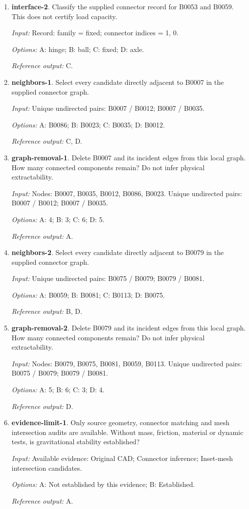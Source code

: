 \begin{enumerate}
\item \textbf{interface-2}. Classify the supplied connector record for B0053 and B0059. This does not certify load capacity.\par {\small \textit{Input:} Record: family = fixed; connector indices = 1, 0. \par\textit{Options:} A: hinge; B: ball; C: fixed; D: axle. \par\textit{Reference output:} C.}
\item \textbf{neighbors-1}. Select every candidate directly adjacent to B0007 in the supplied connector graph.\par {\small \textit{Input:} Unique undirected pairs: B0007 / B0012; B0007 / B0035. \par\textit{Options:} A: B0086; B: B0023; C: B0035; D: B0012. \par\textit{Reference output:} C, D.}
\item \textbf{graph-removal-1}. Delete B0007 and its incident edges from this local graph. How many connected components remain? Do not infer physical extractability.\par {\small \textit{Input:} Nodes: B0007, B0035, B0012, B0086, B0023. Unique undirected pairs: B0007 / B0012; B0007 / B0035. \par\textit{Options:} A: 4; B: 3; C: 6; D: 5. \par\textit{Reference output:} A.}
\item \textbf{neighbors-2}. Select every candidate directly adjacent to B0079 in the supplied connector graph.\par {\small \textit{Input:} Unique undirected pairs: B0075 / B0079; B0079 / B0081. \par\textit{Options:} A: B0059; B: B0081; C: B0113; D: B0075. \par\textit{Reference output:} B, D.}
\item \textbf{graph-removal-2}. Delete B0079 and its incident edges from this local graph. How many connected components remain? Do not infer physical extractability.\par {\small \textit{Input:} Nodes: B0079, B0075, B0081, B0059, B0113. Unique undirected pairs: B0075 / B0079; B0079 / B0081. \par\textit{Options:} A: 5; B: 6; C: 3; D: 4. \par\textit{Reference output:} D.}
\item \textbf{evidence-limit-1}. Only source geometry, connector matching and mesh intersection audits are available. Without mass, friction, material or dynamic tests, is gravitational stability established?\par {\small \textit{Input:} Available evidence: Original CAD; Connector inference; Inset-mesh intersection candidates. \par\textit{Options:} A: Not established by this evidence; B: Established. \par\textit{Reference output:} A.}

\end{enumerate}
